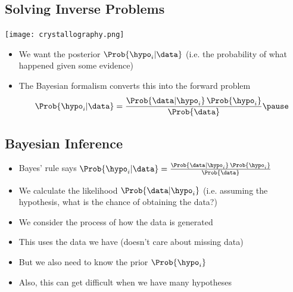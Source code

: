 \begin{slide}
\section[-1]{Solving Inverse Problems}

\begin{PauseHighLight}

\begin{center}
  \texttt{[image: crystallography.png]}
\end{center}
\begin{itemize}\squeeze
\item We want the posterior $\Prob{\hypo_i|\data}$ (i.e. the probability of
  what happened given some evidence)\pause
\item The Bayesian formalism converts this into the forward problem
\begin{align*}
\Prob{\hypo_i|\data} = \frac{\Prob{\data|\hypo_i}\,\Prob{\hypo_i}}{\Prob{\data}}\pause
\end{align*}
\end{itemize}

\end{PauseHighLight}
\end{slide}


\begin{slide}
\section{Bayesian Inference}

\begin{PauseHighLight}
  \begin{itemize}
  \item Bayes' rule says $\Prob{\hypo_i|\data} =
    \frac{\Prob{\data|\hypo_i}\,\Prob{\hypo_i}}{\Prob{\data}}$\pause
  \item We calculate the likelihood $\Prob{\data|\hypo_i}$ (i.e. assuming the
    hypothesis, what is the chance of obtaining the data?)\pause
  \item We consider the process of how the data is generated\pause
  \item This uses the data we have (doesn't care about missing data)\pause
  \item But we also need to know the prior $\Prob{\hypo_i}$\pause
  \item Also, this can get difficult when we have many hypotheses\pause
  \end{itemize}
\end{PauseHighLight}

\end{slide}


